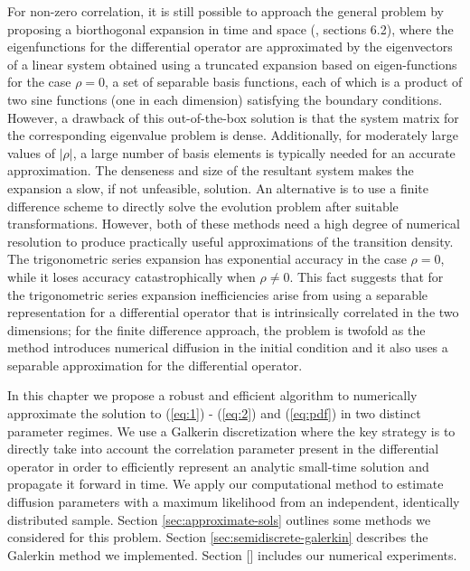 For non-zero correlation, it is still possible to approach the general
problem by proposing a biorthogonal expansion in time and space
(\cite{risken1989fokker-planck}, sections 6.2), where the
eigenfunctions for the differential operator are approximated by the
eigenvectors of a linear system obtained using a truncated expansion
based on eigen-functions for the case $\rho=0$, a set of separable
basis functions, each of which is a product of two sine functions (one
in each dimension) satisfying the boundary conditions. However, a
drawback of this out-of-the-box solution is that the system matrix for
the corresponding eigenvalue problem is dense. Additionally, for
moderately large values of $|\rho|$, a large number of basis elements
is typically needed for an accurate approximation. The denseness and
size of the resultant system makes the expansion a slow, if not
unfeasible, solution. An alternative is to use a finite difference
scheme to directly solve the evolution problem after suitable
transformations. However, both of these methods need a high degree of
numerical resolution to produce practically useful approximations of
the transition density. The trigonometric series expansion has
exponential accuracy in the case $\rho=0$, while it loses accuracy
catastrophically when $\rho\neq 0$. This fact suggests that for the
trigonometric series expansion inefficiencies arise from using a
separable representation for a differential operator that is
intrinsically correlated in the two dimensions; for the finite
difference approach, the problem is twofold as the method introduces
numerical diffusion in the initial condition and it also uses a
separable approximation for the differential operator.

In this chapter we propose a robust and efficient algorithm to
numerically approximate the solution to (\ref{eq:1}) - (\ref{eq:2})
and (\ref{eq:pdf}) in two distinct parameter regimes. We use a
Galkerin discretization where the key strategy is to directly take
into account the correlation parameter present in the differential
operator in order to efficiently represent an analytic small-time
solution and propagate it forward in time. We apply our computational
method to estimate diffusion parameters with a maximum likelihood
from an independent, identically distributed sample. Section
\ref{sec:approximate-sols} outlines some methods we considered for
this problem. Section \ref{sec:semidiscrete-galerkin} describes the
Galerkin method we implemented. Section [] includes our numerical
experiments.


